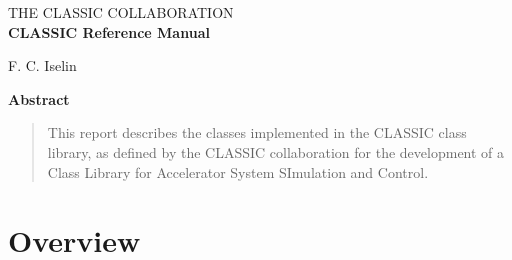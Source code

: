 \documentclass[11pt,a4paper]{report}
\begin{document}
\begin{center}
THE CLASSIC COLLABORATION \\
\vspace{3cm}
{\huge {\bf CLASSIC Reference Manual}}

\vspace{1cm}
F. C. Iselin

\vspace{2cm}
{\bf Abstract}
\end{center}

\begin{quote}
  This report describes the classes implemented in the CLASSIC class
  library,
  as defined by the CLASSIC collaboration for the development of a
  Class Library for Accelerator System SImulation and Control.
\end{quote}

\clearpage

\setlength{\unitlength}{0.8pt}

\tableofcontents
\listoffigures


\chapter{Overview}

\clearpage
\end{document}
